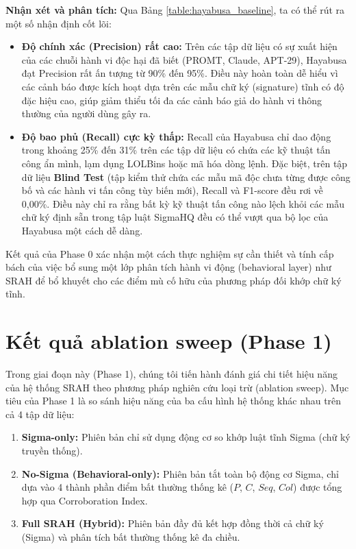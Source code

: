 \documentclass[../main.tex]{subfiles}
\begin{document}
\textbf{Nhận xét và phân tích:}
Qua Bảng \ref{table:hayabusa_baseline}, ta có thể rút ra một số nhận định cốt lõi:
\begin{itemize}
    \item \textbf{Độ chính xác (Precision) rất cao:} Trên các tập dữ liệu có sự xuất hiện của các chuỗi hành vi độc hại đã biết (PROMT, Claude, APT-29), Hayabusa đạt Precision rất ấn tượng từ 90\% đến 95\%. Điều này hoàn toàn dễ hiểu vì các cảnh báo được kích hoạt dựa trên các mẫu chữ ký (signature) tĩnh có độ đặc hiệu cao, giúp giảm thiểu tối đa các cảnh báo giả do hành vi thông thường của người dùng gây ra.
    \item \textbf{Độ bao phủ (Recall) cực kỳ thấp:} Recall của Hayabusa chỉ dao động trong khoảng 25\% đến 31\% trên các tập dữ liệu có chứa các kỹ thuật tấn công ẩn mình, lạm dụng LOLBins hoặc mã hóa dòng lệnh. Đặc biệt, trên tập dữ liệu \textbf{Blind Test} (tập kiểm thử chứa các mẫu mã độc chưa từng được công bố và các hành vi tấn công tùy biến mới), Recall và F1-score đều rơi về 0,00\%. Điều này chỉ ra rằng bất kỳ kỹ thuật tấn công nào lệch khỏi các mẫu chữ ký định sẵn trong tập luật SigmaHQ đều có thể vượt qua bộ lọc của Hayabusa một cách dễ dàng.
    \end{itemize}

Kết quả của Phase 0 xác nhận một cách thực nghiệm sự cần thiết và tính cấp bách của việc bổ sung một lớp phân tích hành vi động (behavioral layer) như SRAH để bổ khuyết cho các điểm mù cố hữu của phương pháp đối khớp chữ ký tĩnh.

\section{Kết quả ablation sweep (Phase 1)}
\label{section:3.2}

Trong giai đoạn này (Phase 1), chúng tôi tiến hành đánh giá chi tiết hiệu năng của hệ thống SRAH theo phương pháp nghiên cứu loại trừ (ablation sweep). Mục tiêu của Phase 1 là so sánh hiệu năng của ba cấu hình hệ thống khác nhau trên cả 4 tập dữ liệu:
\begin{enumerate}
    \item \textbf{Sigma-only:} Phiên bản chỉ sử dụng động cơ so khớp luật tĩnh Sigma (chữ ký truyền thống).
    \item \textbf{No-Sigma (Behavioral-only):} Phiên bản tắt toàn bộ động cơ Sigma, chỉ dựa vào 4 thành phần điểm bất thường thống kê ($P$, $C$, $Seq$, $Col$) được tổng hợp qua Corroboration Index.
    \item \textbf{Full SRAH (Hybrid):} Phiên bản đầy đủ kết hợp đồng thời cả chữ ký (Sigma) và phân tích bất thường thống kê đa chiều.
\end{enumerate}
\end{document}
